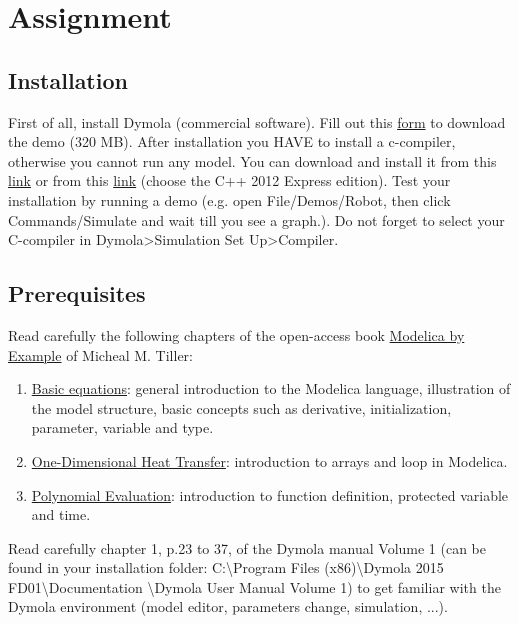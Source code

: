 \documentclass[10pt,a4paper]{article}
\author{Damien Picard}
\begin{document}
\section*{Assignment}

\subsection*{Installation}

First of all, install Dymola (commercial software).  Fill out this \href{http://www.claytex.com/products/dymola/dymola-demo/}{form} to download the demo (320 MB). After installation you HAVE to install a c-compiler, otherwise you cannot run any model.  You can download and install it from this \href{http://www.3ds.com/products-services/catia/products/dymola/c-compiler/}{link} or from this \href{http://www.microsoft.com/en-us/download/details.aspx?id=34673link}{link} (choose the C++ 2012 Express edition).
Test your installation by running a demo (e.g. open File/Demos/Robot, then click Commands/Simulate and wait till you see a graph.). Do not forget to select your C-compiler in Dymola>Simulation Set Up>Compiler.


\subsection*{Prerequisites}
Read carefully the following chapters of the open-access book  \href{http://book.xogeny.com/}{Modelica by Example} of Micheal M. Tiller:

\begin{enumerate}
\item \href{http://book.xogeny.com/behavior/equations/}{Basic equations}: general introduction to the Modelica language, illustration of the model structure, basic concepts such as derivative, initialization, parameter, variable and type.
\item \href{http://book.xogeny.com/behavior/arrays/oned/}{One-Dimensional Heat Transfer}: introduction to arrays and loop in Modelica.
\item \href{http://book.xogeny.com/behavior/functions/polynomial/}{Polynomial Evaluation}: introduction to function definition, protected variable and time.
\end{enumerate}

Read carefully chapter 1, p.23 to 37, of the Dymola manual Volume 1 (can be found in your installation folder: C:\textbackslash Program Files (x86)\textbackslash Dymola 2015 FD01\textbackslash Documentation \textbackslash Dymola User Manual Volume 1) to get familiar with the Dymola environment (model editor, parameters change, simulation, ...).
\end{document}
